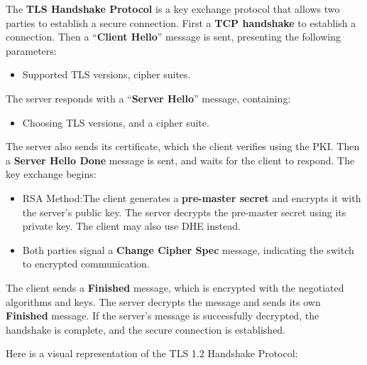 \begin{Def}

    \label{def:tls_handshake}
    The \textbf{TLS Handshake Protocol} is a key exchange protocol that allows two parties to establish
    a secure connection. First a \textbf{TCP handshake} to establish a connection. Then a 
    ``\textbf{Client Hello}'' message is sent, presenting the following parameters:
    \begin{itemize}
        \item Supported TLS versions, cipher suites.
    \end{itemize}
    The server responds with a ``\textbf{Server Hello}'' message, containing:
    \begin{itemize}
        \item  Choosing TLS versions, and a cipher suite.
    \end{itemize}

    \noindent
    The server also sends its certificate, which the client verifies using the PKI. Then a \textbf{Server Hello Done} message is sent, 
    and waits for the client to respond. The key exchange begins:

    \begin{itemize}
        \item RSA Method:The client generates a \textbf{pre-master secret} and encrypts it with the server's public key. The server decrypts the pre-master secret using its private key.
        The client may also use DHE instead.
        \item Both parties signal a \textbf{Change Cipher Spec} message, indicating the switch to encrypted communication.
    \end{itemize}
    
    The client sends a \textbf{Finished} message, which is encrypted with the negotiated algorithms and keys. The server decrypts the message and sends its own \textbf{Finished} message. If the server's message is
    successfully decrypted, the handshake is complete, and the secure connection is established. \hfill \cite{bytebytego2024ssl_tls_https} \cite{rfc5246}
\end{Def}

\newpage 

\noindent
Here is a visual representation of the TLS 1.2 Handshake Protocol:\\

